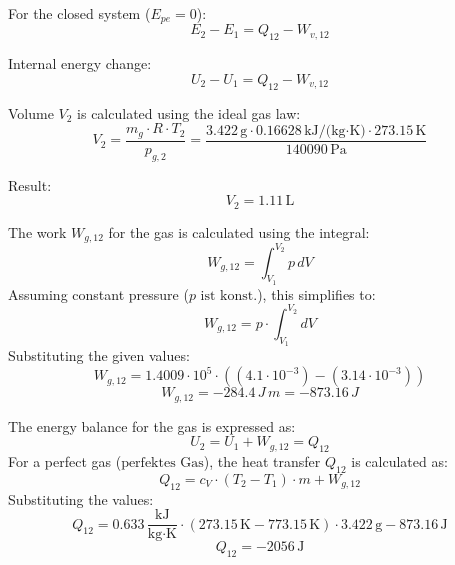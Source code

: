 For the closed system (\(E_{pe} = 0\)):  
\[
E_2 - E_1 = Q_{12} - W_{v,12}
\]

Internal energy change:  
\[
U_2 - U_1 = Q_{12} - W_{v,12}
\]

Volume \(V_2\) is calculated using the ideal gas law:  
\[
V_2 = \frac{m_g \cdot R \cdot T_2}{p_{g,2}} = \frac{3.422 \, \text{g} \cdot 0.16628 \, \text{kJ/(kg·K)} \cdot 273.15 \, \text{K}}{140090 \, \text{Pa}}
\]

Result:  
\[
V_2 = 1.11 \, \text{L}
\]

The work \( W_{g,12} \) for the gas is calculated using the integral:  
\[
W_{g,12} = \int_{V_1}^{V_2} p \, dV
\]  
Assuming constant pressure (\( p \text{ ist konst.} \)), this simplifies to:  
\[
W_{g,12} = p \cdot \int_{V_1}^{V_2} dV
\]  
Substituting the given values:  
\[
W_{g,12} = 1.4009 \cdot 10^5 \cdot \left( (4.1 \cdot 10^{-3}) - (3.14 \cdot 10^{-3}) \right)
\]  
\[
W_{g,12} = -284.4 \, J \, m = -873.16 \, J
\]  

The energy balance for the gas is expressed as:  
\[
U_2 = U_1 + W_{g,12} = Q_{12}
\]  
For a perfect gas (\( \text{perfektes Gas} \)), the heat transfer \( Q_{12} \) is calculated as:  
\[
Q_{12} = c_V \cdot (T_2 - T_1) \cdot m + W_{g,12}
\]  
Substituting the values:  
\[
Q_{12} = 0.633 \, \frac{\text{kJ}}{\text{kg·K}} \cdot (273.15 \, \text{K} - 773.15 \, \text{K}) \cdot 3.422 \, \text{g} - 873.16 \, \text{J}
\]  
\[
Q_{12} = -2056 \, \text{J}
\]